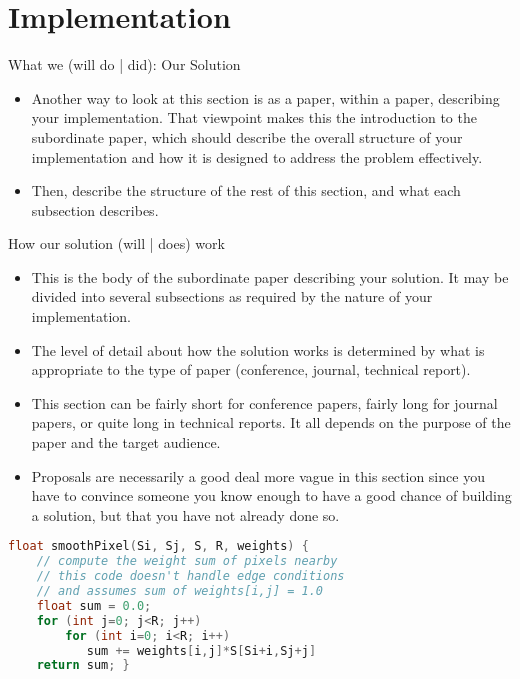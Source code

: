 
\section{Implementation}

What we (will do | did): Our Solution

\begin{itemize}
    \item Another way to look at this section is as a paper, within a paper, describing your implementation. That viewpoint makes this the introduction to the subordinate paper, which should describe the overall structure of your implementation and how it is designed to address the problem effectively.
\item Then, describe the structure of the rest of this section, and what each subsection describes.
\end{itemize}

How our solution (will | does) work
\begin{itemize}
    \item This is the body of the subordinate paper describing your solution. It may be divided into several subsections as required by the nature of your implementation.
    \item The level of detail about how the solution works is determined by what is appropriate to the type of paper (conference, journal, technical report).
    \item This section can be fairly short for conference papers, fairly long for journal papers, or quite long in technical reports. It all depends on the purpose of the paper and the target audience.
    \item Proposals are necessarily a good deal more vague in this section since you have to convince someone you know enough to have a good chance of building a solution, but that you have not already done so.
\end{itemize}

\begin{lstlisting}[caption={Stencil computation in 2D: performs sum of product of nearby pixels with weights.},label={listing:stencil-core}, name=stencil-core, float=h, style=mystyle,language=C++]
float smoothPixel(Si, Sj, S, R, weights) {
    // compute the weight sum of pixels nearby
    // this code doesn't handle edge conditions
    // and assumes sum of weights[i,j] = 1.0 
    float sum = 0.0;
    for (int j=0; j<R; j++)
        for (int i=0; i<R; i++)
           sum += weights[i,j]*S[Si+i,Sj+j]
    return sum; }
\end{lstlisting}